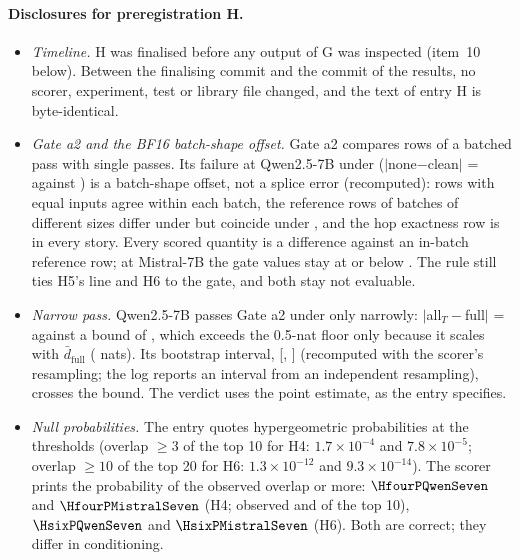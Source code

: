 \paragraph{Disclosures for preregistration H.}
\begin{itemize}\setlength\itemsep{1pt}
  \item \emph{Timeline.} H was finalised before any output of G was inspected (item~10 below). Between the finalising commit and the commit of the results, no scorer, experiment, test or library file changed, and the text of entry H is byte-identical.
  \item \emph{Gate a2 and the BF16 batch-shape offset.} Gate a2 compares rows of a batched pass with single passes. Its failure at Qwen2.5-7B under \fmtPost{} ($\lvert$none$-$clean$\rvert$ = \HatwoNoneCleanPostQwenSeven{} against \HatwoBoundPostQwenSeven{}) is a batch-shape offset, not a splice error (recomputed): rows with equal inputs agree within each batch, the reference rows of batches of different sizes differ under \fmtPost{} but coincide under \fmtOpt{}, and the hop exactness row is \HatwoHopPostQwenSeven{} in every story. Every scored quantity is a difference against an in-batch reference row; at Mistral-7B the gate values stay at or below \HatwoAllFullPostMistralSeven{}. The rule still ties H5's \fmtPost{} line and H6 to the gate, and both stay not evaluable.
  \item \emph{Narrow pass.} Qwen2.5-7B passes Gate a2 under \fmtOpt{} only narrowly: $\lvert$all$_T-$full$\rvert$ = \HatwoAllFullOptQwenSeven{} against a bound of \HatwoBoundOptQwenSeven{}, which exceeds the 0.5-nat floor only because it scales with $\bar d_{\mathrm{full}}$ (\HathreeDfullOptQwenSeven{} nats). Its bootstrap interval, [\HatwoAllFullOptQwenSevenLo{}, \HatwoAllFullOptQwenSevenHi{}] (recomputed with the scorer's resampling; the log reports an interval from an independent resampling), crosses the bound. The verdict uses the point estimate, as the entry specifies.
  \item \emph{Null probabilities.} The entry quotes hypergeometric probabilities at the thresholds (overlap $\geq 3$ of the top 10 for H4: $1.7 \times 10^{-4}$ and $7.8 \times 10^{-5}$; overlap $\geq 10$ of the top 20 for H6: $1.3 \times 10^{-12}$ and $9.3 \times 10^{-14}$). The scorer prints the probability of the observed overlap or more: $\HfourPQwenSeven$ and $\HfourPMistralSeven$ (H4; observed \HfourOverlapQwenSeven{} and \HfourOverlapMistralSeven{} of the top 10), $\HsixPQwenSeven$ and $\HsixPMistralSeven$ (H6). Both are correct; they differ in conditioning.

\end{itemize}
